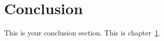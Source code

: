 \chapter{Conclusion}
\label{ch:conclusion}

This is your conclusion section. This is chapter~\ref{ch:conclusion}.